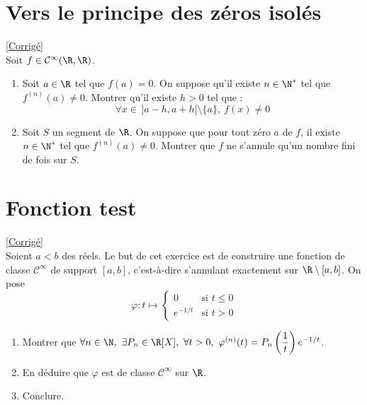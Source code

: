 \documentclass{book}
\begin{document}
	\section{Vers le principe des zéros isolés }
	\textcolor{blue}{\hyperref[Vers le principe des zéros isolés corrigé]{[Corrigé]}}\\
	\label{Vers le principe des zéros isolés}
	Soit $f\in \mathcal C^\infty(\R,\R)$.
	\begin{enumerate}
		\item Soit $a\in \R$ tel que $f(a)=0$. On suppose qu'il existe $n\in \N^*$ tel que $f^{(n)}(a)\ne 0$. Montrer qu'il existe $h>0$ tel que :
		$$\forall x\in\, ]a-h,a+h[\setminus\{a\},\ f(x)\ne 0$$
		\item Soit $S$ un segment de $\R$. On suppose que pour tout zéro $a$ de $f$, il existe $n\in \N^*$ tel que $f^{(n)}(a)\ne 0$. Montrer que $f$ ne s'annule qu'un nombre fini de fois sur $S$.
	\end{enumerate}
	
	\section{Fonction test}
	\textcolor{blue}{\hyperref[Fonction test corrigé]{[Corrigé]}}\\
	\label{Fonction test}
	Soient $a<b$ des réels. Le but de cet exercice est de construire une fonction de classe $\mathcal C^\infty$ de support $[a,b]$, c'est-à-dire s'annulant exactement sur $\R\setminus[a,b]$. On pose\\
	$$\varphi:t\mapsto \begin{cases}
		0&\mbox{si }t\leq 0\\
		e^{-1/t}&\mbox{si }t>0
	\end{cases}$$
	\begin{enumerate}
		\item Montrer que $\forall n\in \N,\ \exists P_n\in \R[X],\ \forall t>0,\ \varphi^{(n)}(t)=P_n\left(\dfrac{1}{t}\right)e^{-1/t}$.
		\item En déduire que $\varphi$ est de classe $\mathcal C^\infty$ sur $\R$.
		\item Conclure.
	\end{enumerate}
	
\end{document}
